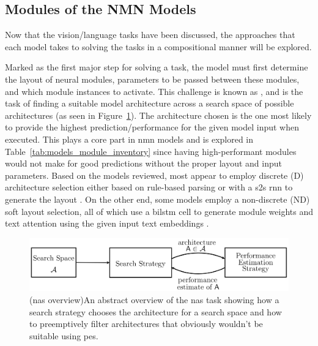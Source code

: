\subsection{Modules of the NMN Models}
\label{subsec:modules_of_the_nmn_models}

Now that the vision/language tasks have been discussed, the approaches that each model takes to solving the tasks in a compositional manner will be explored.

Marked as the first major step for solving a task, the model must first determine the layout of neural modules, parameters to be passed between these modules, and which module instances to activate.
This challenge is known as , and is the task of finding a suitable model architecture across a search space of possible architectures (as seen in Figure~\ref{fig:neural_architecture_search_overview})\cite{elsken_neural_2019}.
The architecture chosen is the one most likely to provide the highest prediction/performance for the given model input when executed.
This plays a core part in \gls{nmn} models and is explored in Table~\ref{tab:models_module_inventory} since having high-performant modules would not make for good predictions without the proper layout and input parameters.
Based on the models reviewed, most appear to employ discrete (D) architecture selection either based on rule-based parsing \cite{andreas_neural_2016,chen_meta_2020} or with a \gls{s2s} \gls{rnn} to generate the layout \cite{hu_learning_2017,chen_teaching_2022,su_toward_2020,kottur_visual_2018,cho_visual_2021}.
On the other end, some models employ a non-discrete (ND) soft layout selection, all of which use a \gls{bilstm} cell to generate module weights and text attention using the given input text embeddings \cite{hu_explainable_2019,hudson_compositional_2018,pahuja_learning_2019}.

\begin{figure}[htbp]
    \centering
    \includegraphics[width=\textwidth,keepaspectratio]{content/chapters/literature_review/discussion/figures/neural_architecture_search_overview.png}
    \captionsource(\acrshort{nas} overview){An abstract overview of the \acrshort{nas} task showing how a search strategy chooses the architecture for a search space and how to preemptively filter architectures that obviously wouldn't be suitable using \acrshort{pes}.\label{fig:neural_architecture_search_overview}}{\citeauthor{elsken_neural_2019}\cite{elsken_neural_2019}}
\end{figure}

